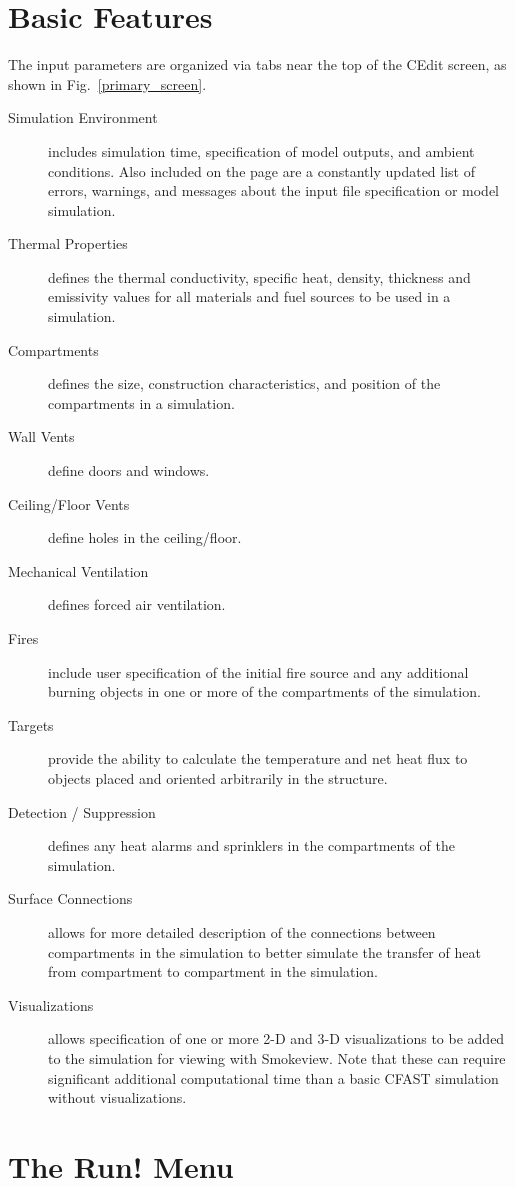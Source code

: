 \section{Basic Features}

The input parameters are organized via tabs near the top of the CEdit screen, as shown in Fig.~\ref{primary_screen}.
\begin{description}
\item[Simulation Environment] includes simulation time, specification of model outputs, and ambient conditions. Also included on the page are a constantly updated list of errors, warnings, and messages about the input file specification or model simulation.
\item[Thermal Properties] defines the thermal conductivity, specific heat, density, thickness and emissivity values for all materials and fuel sources to be used in a simulation.
\item[Compartments] defines the size, construction characteristics, and position of the compartments in a simulation.
\item[Wall Vents] define doors and windows.
\item[Ceiling/Floor Vents] define holes in the ceiling/floor.
\item[Mechanical Ventilation] defines forced air ventilation.
\item[Fires] include user specification of the initial fire source and any additional burning objects in one or more of the compartments of the simulation.
\item[Targets] provide the ability to calculate the temperature and net heat flux to objects placed and oriented arbitrarily in the structure.
\item[Detection / Suppression] defines any heat alarms and sprinklers in the compartments of the simulation.
\item[Surface Connections] allows for more detailed description of the connections between compartments in the simulation to better simulate the transfer of heat from compartment to compartment in the simulation.
\item[Visualizations] allows specification of one or more 2-D and 3-D visualizations to be added to the simulation for viewing with Smokeview. Note that these can require significant additional computational time than a basic CFAST simulation without visualizations.
\end{description}


\section{The Run! Menu}

